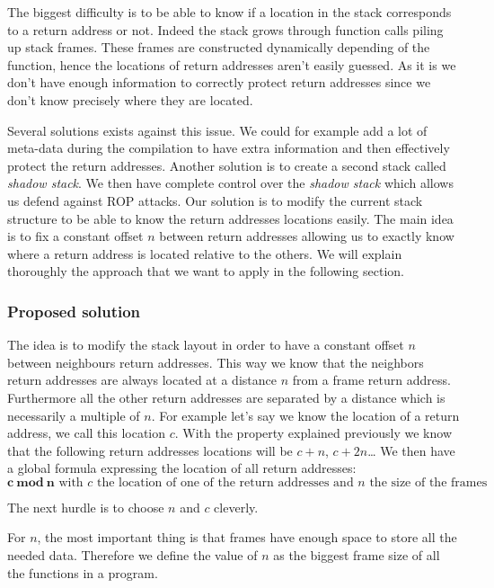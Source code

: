 \documentclass[11pt]{sdm}
\begin{document}
The biggest difficulty is to be able to know if a location in the stack corresponds to a return address or not. Indeed the stack grows through function calls piling up stack frames. 
These frames are constructed dynamically depending of the function, hence the locations of return addresses aren't easily guessed. As it is we don't have enough information to correctly protect return addresses since we don't know precisely where they are located.

Several solutions exists against this issue. We could for example add a lot of meta-data during the compilation to have extra information and then effectively protect the return addresses. Another solution is to create a second stack called \textit{shadow stack}. We then have complete control over the \textit{shadow stack} which allows us defend against ROP attacks.
\textcolor{maybe expose the cons of these approaches from our point of view}

Our solution is to modify the current stack structure to be able to know the return addresses locations easily. The main idea is to fix a constant offset $n$ between return addresses allowing us to exactly know where a return address is located relative to the others. We will explain thoroughly the approach that we want to apply in the following section.

\subsubsection{Proposed solution}
\label{ssub:Proposed solution}
The idea is to modify the stack layout in order to have a constant offset $n$ between neighbours return addresses. This way we know that the neighbors return addresses are always located at a distance $n$ from a frame return address. Furthermore all the other return addresses are separated by a distance which is necessarily a multiple of $n$.
For example let's say we know the location of a return address, we call this location $c$.
With the property explained previously we know that the following return addresses locations will be $c+n$, $c+2n$\dots
We then have a global formula expressing the location of all return addresses: 
$$ \mathbf{c~mod~n} \text{     with } c \text{ the location of one of the return addresses and } n \text{ the size of the frames }$$

The next hurdle is to choose $n$ and $c$ cleverly. 

For $n$, the most important thing is that frames have enough space to store all the needed data. Therefore we define the value of $n$ as the biggest frame size of all the functions in a program. 
\end{document}
